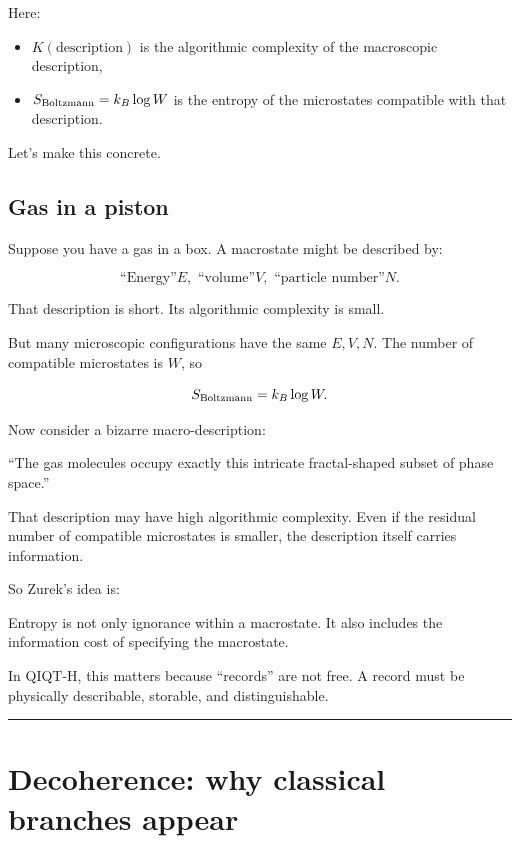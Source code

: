 \documentclass[11pt,a4paper]{article}
\newenvironment{qiqtquote}{\begin{mdframed}[style=quotestyle]}{\end{mdframed}}
\begin{document}
Here:

\begin{itemize}
  \item $K(\text{description})$ is the algorithmic complexity of the macroscopic description,
  \item $S_{\rm Boltzmann}=k_B\log W$ is the entropy of the microstates compatible with that description.
\end{itemize}

Let’s make this concrete.

\subsection{Gas in a piston}

Suppose you have a gas in a box. A macrostate might be described by:

\[
\text{``Energy''} E, \text{ ``volume''} V, \text{ ``particle number''} N.
\]

That description is short. Its algorithmic complexity is small.

But many microscopic configurations have the same $E,V,N$. The number of compatible microstates is $W$, so

\[
S_{\rm Boltzmann}=k_B\log W.
\]

Now consider a bizarre macro-description:

\begin{qiqtquote}
“The gas molecules occupy exactly this intricate fractal-shaped subset of phase space.”
\end{qiqtquote}

That description may have high algorithmic complexity. Even if the residual number of compatible microstates is smaller, the description itself carries information.

So Zurek’s idea is:

\begin{qiqtquote}
Entropy is not only ignorance within a macrostate. It also includes the information cost of specifying the macrostate.
\end{qiqtquote}

In QIQT-H, this matters because “records” are not free. A record must be physically describable, storable, and distinguishable.

\medskip\hrule\medskip

\section{Decoherence: why classical branches appear}
\end{document}
